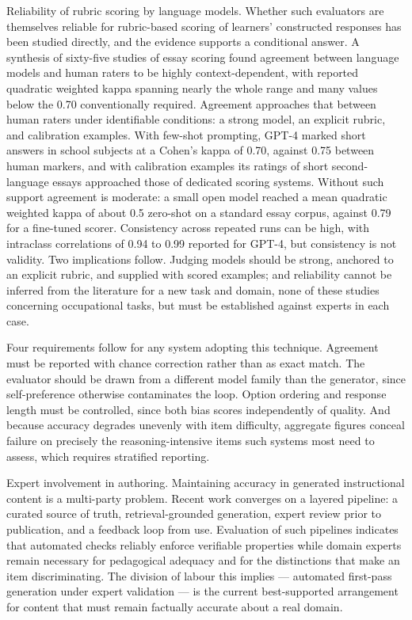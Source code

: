Reliability of rubric scoring by language models. Whether such evaluators are themselves reliable for rubric-based scoring of learners' constructed responses has been studied directly, and the evidence supports a conditional answer. A synthesis of sixty-five studies of essay scoring found agreement between language models and human raters to be highly context-dependent, with reported quadratic weighted kappa spanning nearly the whole range and many values below the 0.70 conventionally required\cite{r101}. Agreement approaches that between human raters under identifiable conditions: a strong model, an explicit rubric, and calibration examples. With few-shot prompting, GPT-4 marked short answers in school subjects at a Cohen's kappa of 0.70, against 0.75 between human markers\cite{r102}, and with calibration examples its ratings of short second-language essays approached those of dedicated scoring systems\cite{r103}. Without such support agreement is moderate: a small open model reached a mean quadratic weighted kappa of about 0.5 zero-shot on a standard essay corpus, against 0.79 for a fine-tuned scorer\cite{r104}. Consistency across repeated runs can be high, with intraclass correlations of 0.94 to 0.99 reported for GPT-4\cite{r105}, but consistency is not validity. Two implications follow. Judging models should be strong, anchored to an explicit rubric, and supplied with scored examples; and reliability cannot be inferred from the literature for a new task and domain, none of these studies concerning occupational tasks, but must be established against experts in each case.

Four requirements follow for any system adopting this technique. Agreement must be reported with chance correction rather than as exact match. The evaluator should be drawn from a different model family than the generator, since self-preference otherwise contaminates the loop. Option ordering and response length must be controlled, since both bias scores independently of quality. And because accuracy degrades unevenly with item difficulty, aggregate figures conceal failure on precisely the reasoning-intensive items such systems most need to assess, which requires stratified reporting.

Expert involvement in authoring. Maintaining accuracy in generated instructional content is a multi-party problem. Recent work converges on a layered pipeline: a curated source of truth, retrieval-grounded generation, expert review prior to publication, and a feedback loop from use. Evaluation of such pipelines indicates that automated checks reliably enforce verifiable properties while domain experts remain necessary for pedagogical adequacy and for the distinctions that make an item discriminating\cite{r61}. The division of labour this implies --- automated first-pass generation under expert validation --- is the current best-supported arrangement for content that must remain factually accurate about a real domain.

